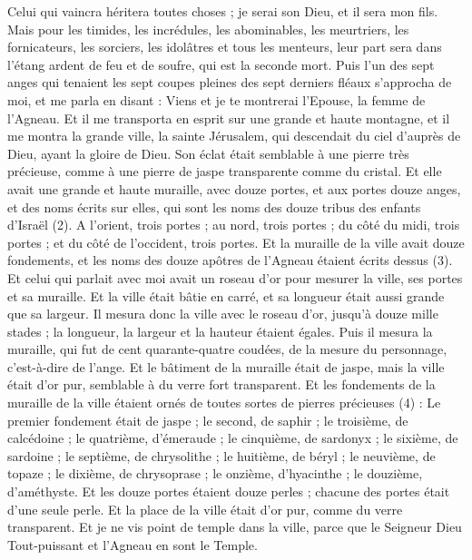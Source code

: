 \begin{multicols}{2}
Celui qui vaincra héritera toutes choses ; je serai son Dieu, et il sera mon fils.
Mais pour les timides, les incrédules, les abominables, les meurtriers, les fornicateurs, les sorciers, les idolâtres et tous les menteurs, leur part sera dans l'étang ardent de feu et de soufre, qui est la seconde mort.
Puis l’un des sept anges qui tenaient les sept coupes pleines des sept derniers fléaux s'approcha de moi, et me parla en disant : Viens et je te montrerai l'Epouse, la femme de l'Agneau.
Et il me transporta en esprit sur une grande et haute montagne, et il me montra la grande ville, la sainte Jérusalem, qui descendait du ciel d’auprès de Dieu,
ayant la gloire de Dieu. Son éclat était semblable à une pierre très précieuse, comme à une pierre de jaspe transparente comme du cristal.
Et elle avait une grande et haute muraille, avec douze portes, et aux portes douze anges, et des noms écrits sur elles, qui sont les noms des douze tribus des enfants d'Israël (2).
A l'orient, trois portes ; au nord, trois portes ; du côté du midi, trois portes ; et du côté de l'occident, trois portes.
Et la muraille de la ville avait douze fondements, et les noms des douze apôtres de l'Agneau étaient écrits dessus (3).
Et celui qui parlait avec moi avait un roseau d'or pour mesurer la ville, ses portes et sa muraille.
Et la ville était bâtie en carré, et sa longueur était aussi grande que sa largeur. Il mesura donc la ville avec le roseau d'or, jusqu'à douze mille stades ; la longueur, la largeur et la hauteur étaient égales.
Puis il mesura la muraille, qui fut de cent quarante-quatre coudées, de la mesure du personnage, c'est-à-dire de l'ange.
Et le bâtiment de la muraille était de jaspe, mais la ville était d'or pur, semblable à du verre fort transparent.
Et les fondements de la muraille de la ville étaient ornés de toutes sortes de pierres précieuses (4) : Le premier fondement était de jaspe ; le second, de saphir ; le troisième, de calcédoine ; le quatrième, d'émeraude ;
le cinquième, de sardonyx ; le sixième, de sardoine ; le septième, de chrysolithe ; le huitième, de béryl ; le neuvième, de topaze ; le dixième, de chrysoprase ; le onzième, d'hyacinthe ; le douzième, d'améthyste.
Et les douze portes étaient douze perles ; chacune des portes était d'une seule perle. Et la place de la ville était d'or pur, comme du verre transparent.
Et je ne vis point de temple dans la ville, parce que le Seigneur Dieu Tout-puissant et l'Agneau en sont le Temple.

\end{multicols}
